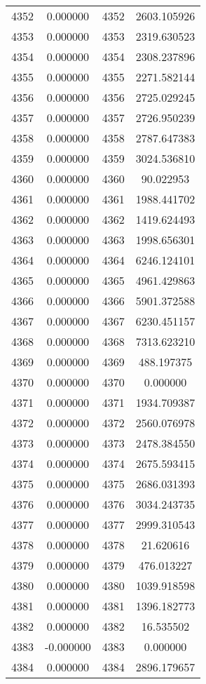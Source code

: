 \documentclass[12pt]{article}
\begin{document}
\begin{longtable}{@{}cccc@{}}
4352 & 0.000000 & 4352 & 2603.105926 \\
4353 & 0.000000 & 4353 & 2319.630523 \\
4354 & 0.000000 & 4354 & 2308.237896 \\
4355 & 0.000000 & 4355 & 2271.582144 \\
4356 & 0.000000 & 4356 & 2725.029245 \\
4357 & 0.000000 & 4357 & 2726.950239 \\
4358 & 0.000000 & 4358 & 2787.647383 \\
4359 & 0.000000 & 4359 & 3024.536810 \\
4360 & 0.000000 & 4360 & 90.022953 \\
4361 & 0.000000 & 4361 & 1988.441702 \\
4362 & 0.000000 & 4362 & 1419.624493 \\
4363 & 0.000000 & 4363 & 1998.656301 \\
4364 & 0.000000 & 4364 & 6246.124101 \\
4365 & 0.000000 & 4365 & 4961.429863 \\
4366 & 0.000000 & 4366 & 5901.372588 \\
4367 & 0.000000 & 4367 & 6230.451157 \\
4368 & 0.000000 & 4368 & 7313.623210 \\
4369 & 0.000000 & 4369 & 488.197375 \\
4370 & 0.000000 & 4370 & 0.000000 \\
4371 & 0.000000 & 4371 & 1934.709387 \\
4372 & 0.000000 & 4372 & 2560.076978 \\
4373 & 0.000000 & 4373 & 2478.384550 \\
4374 & 0.000000 & 4374 & 2675.593415 \\
4375 & 0.000000 & 4375 & 2686.031393 \\
4376 & 0.000000 & 4376 & 3034.243735 \\
4377 & 0.000000 & 4377 & 2999.310543 \\
4378 & 0.000000 & 4378 & 21.620616 \\
4379 & 0.000000 & 4379 & 476.013227 \\
4380 & 0.000000 & 4380 & 1039.918598 \\
4381 & 0.000000 & 4381 & 1396.182773 \\
4382 & 0.000000 & 4382 & 16.535502 \\
4383 & -0.000000 & 4383 & 0.000000 \\
4384 & 0.000000 & 4384 & 2896.179657 \\

\end{longtable}
\end{document}
